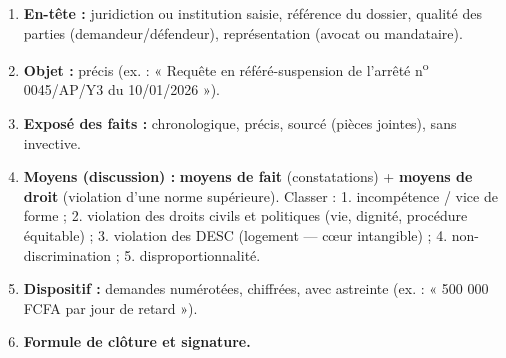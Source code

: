 \documentclass[11pt]{article}
\begin{document}
\begin{methode}
\begin{enumerate}
    \item \textbf{En-tête :} juridiction ou institution saisie, référence du dossier, qualité des parties (demandeur/défendeur), représentation (avocat ou mandataire).
    \item \textbf{Objet :} précis (ex. : « Requête en référé-suspension de l'arrêté n\textsuperscript{o} 0045/AP/Y3 du 10/01/2026 »).
    \item \textbf{Exposé des faits :} chronologique, précis, sourcé (pièces jointes), sans invective.
    \item \textbf{Moyens (discussion) :} \textbf{moyens de fait} (constatations) + \textbf{moyens de droit} (violation d'une norme supérieure). Classer : 1. incompétence / vice de forme ; 2. violation des droits civils et politiques (vie, dignité, procédure équitable) ; 3. violation des DESC (logement — cœur intangible) ; 4. non-discrimination ; 5. disproportionnalité.
    \item \textbf{Dispositif :} demandes numérotées, chiffrées, avec astreinte (ex. : « 500 000 FCFA par jour de retard »).
    \item \textbf{Formule de clôture et signature.}
\end{enumerate}
\end{methode}
\end{document}
